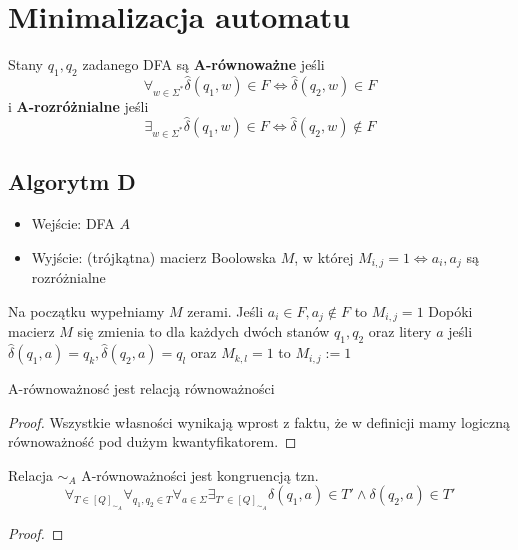 \section{Minimalizacja automatu}

\begin{definition}
    Stany \( q_1, q_2 \) zadanego DFA są \textbf{A-równoważne} jeśli
    \[
        \forall_{w \in \Sigma^*} \hat \delta(q_1, w) \in F \iff \hat \delta(q_2, w) \in F
    \]
    i \textbf{A-rozróżnialne} jeśli
    \[
        \exists_{w \in \Sigma^*} \hat \delta(q_1, w) \in F \iff \hat \delta(q_2, w) \notin F
    \]
\end{definition}

\subsection{Algorytm D}
\begin{itemize}
    \item Wejście: DFA \( A \)
    \item Wyjście: (trójkątna) macierz Boolowska \( M \), w której \( M_{i, j} = 1 \iff a_i, a_j \) są rozróżnialne
\end{itemize}

Na początku wypełniamy \( M \) zerami.
Jeśli \( a_i \in F, a_j \notin F \) to \( M_{i, j} = 1 \)
Dopóki macierz \( M \) się zmienia to dla każdych dwóch stanów \( q_1, q_2 \) oraz litery \( a \) jeśli \( \hat \delta(q_1, a) = q_k, \hat \delta(q_2, a) = q_l \) oraz \( M_{k, l} = 1 \) to \( M_{i, j} := 1 \) 

\begin{lemma}
    A-równoważnosć jest relacją równoważności
\end{lemma}
\begin{proof}
    Wszystkie własności wynikają wprost z faktu, że 
    w definicji mamy logiczną równoważność pod dużym kwantyfikatorem.
\end{proof}

\begin{lemma}
    Relacja \(\sim_A\) A-równoważności jest kongruencją tzn.
    \[
        \forall_{T \in [Q]_{\sim_A}} 
        \forall_{q_1, q_2 \in T}
        \forall_{a \in \Sigma}
        \exists_{T' \in [Q]_{\sim_A}}
        \delta(q_1, a) \in T' \land \delta(q_2, a) \in T'
    \]
\end{lemma}
\begin{proof}

\end{proof}


